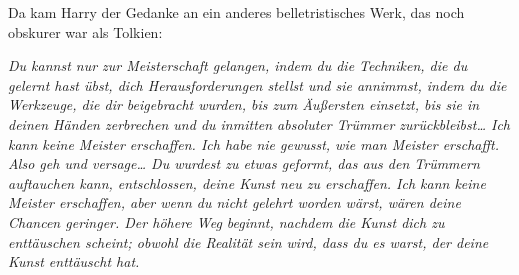 Da kam Harry der Gedanke an ein anderes belletristisches Werk, das noch obskurer war als Tolkien:

\emph{Du kannst nur zur Meisterschaft gelangen, indem du die Techniken, die du gelernt hast übst, dich Herausforderungen stellst und sie annimmst, indem du die Werkzeuge, die dir beigebracht wurden, bis zum Äußersten einsetzt, bis sie in deinen Händen zerbrechen und du inmitten absoluter Trümmer zurückbleibst… Ich kann keine Meister erschaffen. Ich habe nie gewusst, wie man Meister erschafft. Also geh und versage… Du wurdest zu etwas geformt, das aus den Trümmern auftauchen kann, entschlossen, deine Kunst neu zu erschaffen. Ich kann keine Meister erschaffen, aber wenn du nicht gelehrt worden wärst, wären deine Chancen geringer. Der höhere Weg beginnt, nachdem die Kunst dich zu enttäuschen scheint; obwohl die Realität sein wird, dass du es warst, der deine Kunst enttäuscht hat.}

